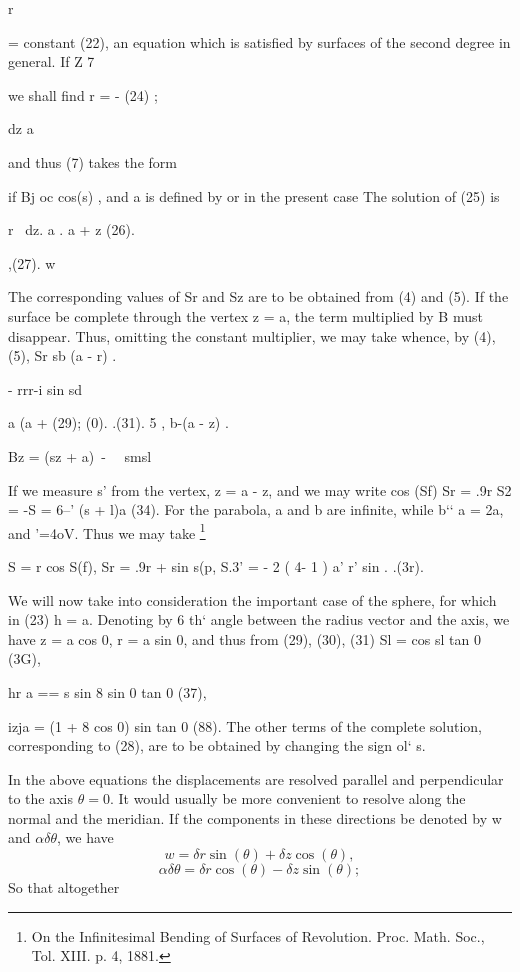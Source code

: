 r

= constant (22), an equation which is satisfied by surfaces of the second
degree in general. If Z 7

we shall find r  = -  (24) ;

dz a

and thus (7) takes the form


if Bj oc cos(s) , and a is defined by or in the present case The solution of (25)
is

r~ dz.  a . a + z (26).

,(27).  w

The corresponding values of Sr and Sz are to be obtained from (4) and (5).  If
the surface be complete through the vertex z = a, the term multiplied by B must
disappear. Thus, omitting the constant multiplier, we may take whence, by (4),
(5), Sr sb (a - r)   .

  - rrr-i sin sd

a (a + (29); (0).  .(31).  5 , b-(a - z) .

Bz = (sz + a)~-~~ smsl

If we measure s' from the vertex, z = a - z, and we may write cos (Sf) Sr = .9r
S2 = -S = 6--' (s + l)a (34).  For the parabola, a and b are infinite, while
b‘‘ a = 2a, and '=4oV. Thus we may take
\footnote{On the Infinitesimal Bending of Surfaces of Revolution. Proc. Math.
Soc., Tol. XIII. p. 4, 1881.}

S = r cos S(f), Sr = .9r + sin s(p, S.3' = - 2 ( 4- 1 ) a' r' sin . .(3r).

We will now take into consideration the
important case of the sphere, for which in (23) h = a. Denoting by 6 th‘ angle
between the radius vector and the axis, we have z = a cos 0, r = a sin 0, and
thus from (29), (30), (31) Sl = cos sl tan  0 (3G),

hr a == s sin 8 sin 0 tan  0 (37),

izja = (1 + 8 cos 0) sin tan  0 (88).  The other terms of the complete
solution, corresponding to (28), are to be obtained by changing the sign ol‘ s.

In the above equations the displacements are resolved parallel and
perpendicular to the axis \(\theta = 0\). It would usually be more convenient
to resolve along the normal and the meridian. If the components in these
directions be denoted by w and \( \alpha \delta \theta \), we have
\[
w = \delta r \sin (\theta) + \delta z  \cos (\theta),
\]
\[
\alpha \delta \theta = \delta r \cos (\theta) - \delta z  \sin (\theta);
\]
So that altogether

